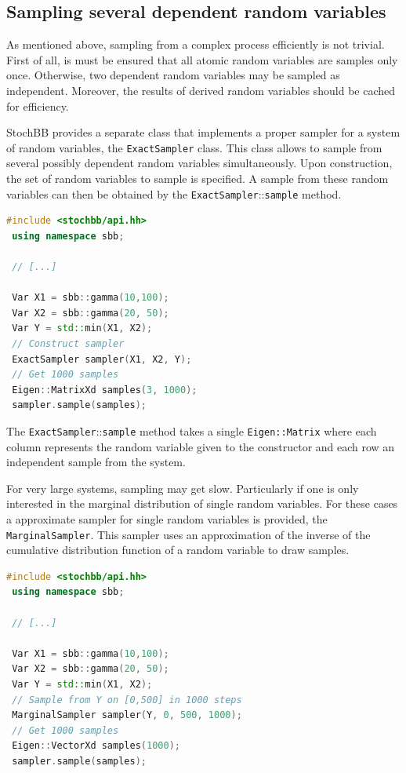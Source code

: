 \documentclass[a4paper, 10pt]{paper}
\newcommand{\code}[1]{\texttt{#1}}
\newcommand{\class}[1]{\code{#1}}
\newcommand{\method}[2]{\code{#1}::\code{#2}}
\begin{document}
\subsection{Sampling several dependent random variables}
As mentioned above, sampling from a complex process efficiently is not trivial. First of all, is
must be ensured that all atomic random variables are samples only once. Otherwise, two dependent
random variables may be sampled as independent. Moreover, the results of derived random variables
should be cached for efficiency. 

StochBB provides a separate class that implements a proper
sampler for a system of random variables, the \class{ExactSampler} class. This class allows to
sample from several possibly dependent random variables simultaneously. Upon construction, the
set of random variables to sample is specified. A sample from these random variables can then be
obtained by the \method{ExactSampler}{sample} method.
\begin{lstlisting}[language=C++]
 #include <stochbb/api.hh>
 using namespace sbb;

 // [...]

 Var X1 = sbb::gamma(10,100);
 Var X2 = sbb::gamma(20, 50);
 Var Y = std::min(X1, X2);
 // Construct sampler
 ExactSampler sampler(X1, X2, Y);
 // Get 1000 samples
 Eigen::MatrixXd samples(3, 1000);
 sampler.sample(samples);
\end{lstlisting}

The \method{ExactSampler}{sample} method takes a single \class{Eigen::Matrix} where each column
represents the random variable given to the constructor and each row an independent sample from
the system.

For very large systems, sampling may get slow. Particularly if one is only interested
in the marginal distribution of single random variables. For these cases a approximate sampler
for single random variables is provided, the \class{MarginalSampler}. This sampler uses an
approximation of the inverse of the cumulative distribution function of a random variable
to draw samples.
\begin{lstlisting}[language=C++]
 #include <stochbb/api.hh>
 using namespace sbb;

 // [...]

 Var X1 = sbb::gamma(10,100);
 Var X2 = sbb::gamma(20, 50);
 Var Y = std::min(X1, X2);
 // Sample from Y on [0,500] in 1000 steps
 MarginalSampler sampler(Y, 0, 500, 1000);
 // Get 1000 samples
 Eigen::VectorXd samples(1000);
 sampler.sample(samples);
\end{lstlisting}
\end{document}
